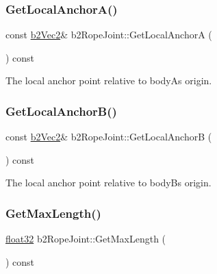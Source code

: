 \mbox{\label{classb2_rope_joint_a5fb600991e676e61e266ecb99448bb86}} 
\subsubsection{\texorpdfstring{GetLocalAnchorA()}{GetLocalAnchorA()}}
{\footnotesize\ttfamily const \mbox{\hyperlink{structb2_vec2}{b2\+Vec2}}\& b2\+Rope\+Joint\+::\+Get\+Local\+AnchorA (\begin{DoxyParamCaption}{ }\end{DoxyParamCaption}) const\hspace{0.3cm}{\ttfamily [inline]}}



The local anchor point relative to bodyA\textquotesingle{}s origin. 

\mbox{\label{classb2_rope_joint_a8a9b925c7ffa11d331ba369cc9fe2ac5}} 
\subsubsection{\texorpdfstring{GetLocalAnchorB()}{GetLocalAnchorB()}}
{\footnotesize\ttfamily const \mbox{\hyperlink{structb2_vec2}{b2\+Vec2}}\& b2\+Rope\+Joint\+::\+Get\+Local\+AnchorB (\begin{DoxyParamCaption}{ }\end{DoxyParamCaption}) const\hspace{0.3cm}{\ttfamily [inline]}}



The local anchor point relative to bodyB\textquotesingle{}s origin. 

\mbox{\label{classb2_rope_joint_abdcc1962f25103a49f6e3f4182559efa}} 
\subsubsection{\texorpdfstring{GetMaxLength()}{GetMaxLength()}}
{\footnotesize\ttfamily \mbox{\hyperlink{b2_settings_8h_aacdc525d6f7bddb3ae95d5c311bd06a1}{float32}} b2\+Rope\+Joint\+::\+Get\+Max\+Length (\begin{DoxyParamCaption}{ }\end{DoxyParamCaption}) const}

